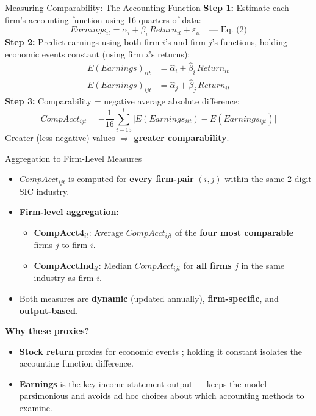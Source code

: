 \documentclass[aspectratio=169,xcolor=dvipsnames]{beamer}
\begin{document}
\begin{frame}{Measuring Comparability: The Accounting Function}
    \textbf{Step 1:} Estimate each firm's accounting function using 16 quarters of data:
    \[
        Earnings_{it} = \alpha_i + \beta_i \, Return_{it} + \varepsilon_{it} \quad \text{--- Eq.\ (2)}
    \]
    \vspace{0.1cm}
    \textbf{Step 2:} Predict earnings using both firm $i$'s and firm $j$'s functions, holding economic events constant (using firm $i$'s returns):
    \begin{align*}
        E(Earnings)_{iit} &= \hat{\alpha}_i + \hat{\beta}_i \, Return_{it} \\
        E(Earnings)_{ijt} &= \hat{\alpha}_j + \hat{\beta}_j \, Return_{it}
    \end{align*}
    \textbf{Step 3:} Comparability = negative average absolute difference:
    \[
        CompAcct_{ijt} = -\frac{1}{16} \sum_{t-15}^{t} \bigl| E(Earnings_{iit}) - E(Earnings_{ijt}) \bigr|
    \]
    Greater (less negative) values $\Rightarrow$ \textcolor{hkustred}{\textbf{greater comparability}}.
\end{frame}

\begin{frame}{Aggregation to Firm-Level Measures}
    \begin{itemize}
        \item $CompAcct_{ijt}$ is computed for \textbf{every firm-pair} $(i,j)$ within the same 2-digit SIC industry.
        \item \textbf{Firm-level aggregation:}
        \begin{itemize}
            \item \textcolor{hkustred}{\textbf{CompAcct4$_{it}$}}: Average $CompAcct_{ijt}$ of the \textbf{four most comparable} firms $j$ to firm $i$.
            \item \textcolor{hkustred}{\textbf{CompAcctInd$_{it}$}}: Median $CompAcct_{ijt}$ for \textbf{all firms $j$} in the same industry as firm $i$.
        \end{itemize}
        \item Both measures are \textbf{dynamic} (updated annually), \textbf{firm-specific}, and \textbf{output-based}.
    \end{itemize}
    \vspace{0.3cm}
    \textbf{Why these proxies?}
    \begin{itemize}
        \item \textbf{Stock return} proxies for economic events \citep{kothari2001capital}; holding it constant isolates the accounting function difference.
        \item \textbf{Earnings} is the key income statement output --- keeps the model parsimonious and avoids ad hoc choices about which accounting methods to examine.
    \end{itemize}
\end{frame}
\end{document}
